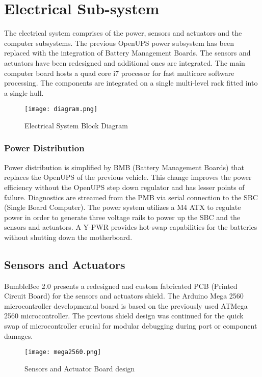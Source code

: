 \documentclass[journal,12pt]{IEEEtran}
\begin{document}
\section{Electrical Sub-system}
The electrical system comprises of the power, sensors and actuators and the computer subsystems. The previous OpenUPS power subsystem has been replaced with the integration of Battery Management Boards. The sensors and actuators have been redesigned and additional ones are integrated. The main computer board hosts a quad core i7 processor for fast multicore software processing. The components are integrated on a single multi-level rack fitted into a single hull. 

\begin{figure}[h]
\centering
\texttt{[image: diagram.png]}
\caption{Electrical System Block Diagram}
\captionsetup{justification=centering}
\end{figure}

\subsubsection{Power Distribution}
Power distribution is simplified by BMB (Battery Management Boards) that replaces the OpenUPS of the previous vehicle. This change improves the power efficiency without the OpenUPS step down regulator and has lesser points of failure. Diagnostics are streamed from the PMB via serial connection to the SBC  (Single Board Computer). The power system utilizes a M4 ATX to regulate power in order to generate three voltage rails to power up the SBC and the sensors and actuators. A Y-PWR provides hot-swap capabilities for the batteries without shutting down the motherboard. 

\subsection{Sensors and Actuators}
BumbleBee 2.0 presents a redesigned and custom fabricated PCB (Printed Circuit Board) for the sensors and actuators shield. The Arduino Mega 2560 microcontroller developmental board is based on the previously used ATMega 2560 microcontroller. The previous shield design was continued for the quick swap of microcontroller crucial for modular debugging during port or component damages. \\

\begin{figure}[h]
\centering
\texttt{[image: mega2560.png]}
\caption{Sensors and Actuator Board design}
\captionsetup{justification=centering}
\end{figure}
\end{document}
